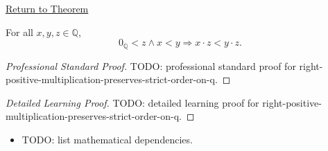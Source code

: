 \newpage
{}
\label{prf:right-positive-multiplication-preserves-strict-order-on-q}

\begin{remark*}[Return]
\hyperref[cor:right-positive-multiplication-preserves-strict-order-on-q]{Return to Theorem}
\end{remark*}

\begin{corollary*}
For all $x,y,z\in\mathbb{Q}$,
\[
0_{\mathbb{Q}}<z\land x<y
\Longrightarrow
x\cdot z<y\cdot z.
\]
\end{corollary*}

\begin{proof}[Professional Standard Proof]
\LRAProofBodyStart
TODO: professional standard proof for right-positive-multiplication-preserves-strict-order-on-q.
\end{proof}

\begin{proof}[Detailed Learning Proof]
\LRAProofBodyStart
TODO: detailed learning proof for right-positive-multiplication-preserves-strict-order-on-q.
\end{proof}

\begin{remark*}
\end{remark*}

\begin{dependencies}
\begin{itemize}
  \item TODO: list mathematical dependencies.
\end{itemize}
\end{dependencies}

\clearpage
